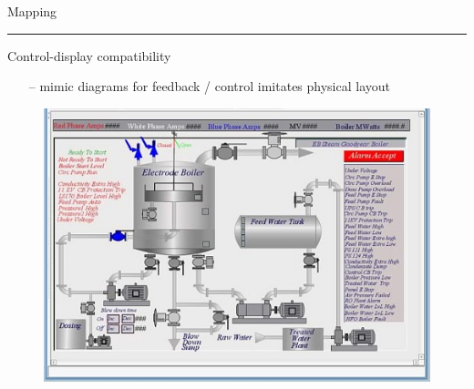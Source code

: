 \documentclass[pdf]{beamer}
\begin{document}
\begin{frame}
    {Mapping}{\textcolor{red}{\rule{12cm}{1.2pt}}}
    
 	Control-display compatibility
    \begin{itemize}    
    \item[\textcolor{black}{--}] mimic diagrams for feedback / control imitates physical layout
 
    \end{itemize}
    
    \begin{figure}[b]
    	\includegraphics[scale = 0.5, center]{19_Picture.jpg}
    \end{figure}
\end{frame}



\end{document}

